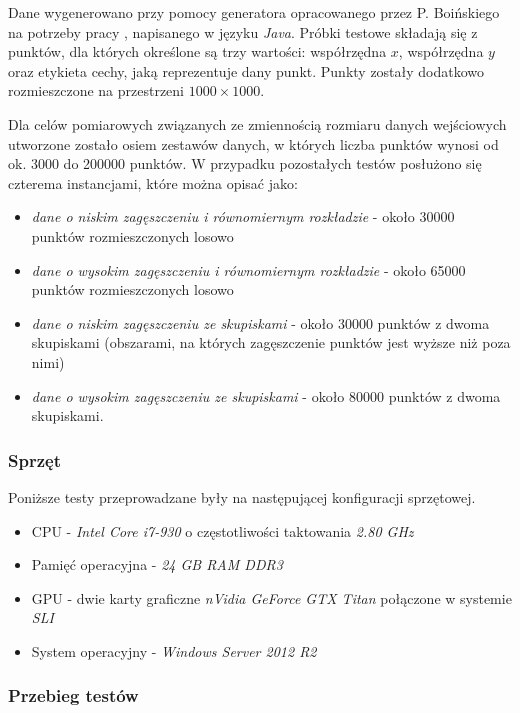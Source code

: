 \documentclass[12pt]{article}
\begin{document}
Dane wygenerowano przy pomocy generatora opracowanego przez P. Boińskiego na potrzeby pracy \cite{boinski}, napisanego w języku \textit{Java}. Próbki testowe składają się z punktów, dla których określone są trzy wartości: współrzędna $ x $, współrzędna $ y $ oraz etykieta cechy, jaką reprezentuje dany punkt. Punkty zostały dodatkowo rozmieszczone na przestrzeni $ 1000 \times 1000$. 

Dla celów pomiarowych związanych ze zmiennością rozmiaru danych wejściowych utworzone zostało osiem zestawów danych, w których liczba punktów wynosi od ok. 3000 do 200000 punktów. W przypadku pozostałych testów posłużono się czterema instancjami, które można opisać jako:

\begin{itemize}
\item \textit{dane o niskim zagęszczeniu i równomiernym rozkładzie} - około 30000 punktów rozmieszczonych losowo
\item \textit{dane o wysokim zagęszczeniu i równomiernym rozkładzie} - około 65000 punktów rozmieszczonych losowo
\item \textit{dane o niskim zagęszczeniu ze skupiskami} - około 30000 punktów z dwoma skupiskami (obszarami, na których zagęszczenie punktów jest wyższe niż poza nimi)
\item \textit{dane o wysokim zagęszczeniu ze skupiskami} - około 80000 punktów z dwoma skupiskami.
\end{itemize}

\subsubsection{Sprzęt}

Poniższe testy przeprowadzane były na następującej konfiguracji sprzętowej. 

\begin{itemize}
\item CPU - \textit{Intel Core i7-930} o częstotliwości taktowania \textit{2.80 GHz}
\item Pamięć operacyjna - \textit{24 GB RAM DDR3}
\item GPU - dwie karty graficzne \textit{nVidia GeForce GTX Titan} połączone w systemie \textit{SLI}
\item System operacyjny - \textit{Windows Server 2012 R2}
\end{itemize}

\subsubsection{Przebieg testów}
\end{document}
